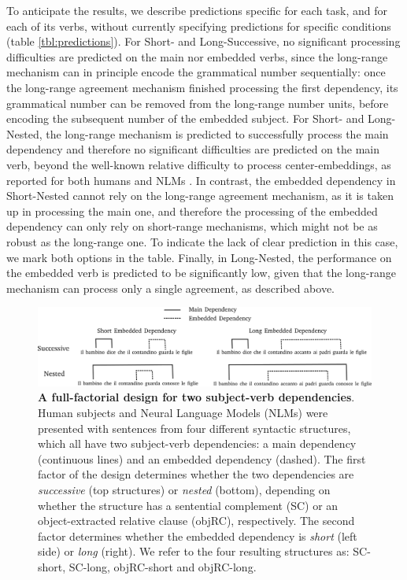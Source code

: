 To anticipate the results, we describe predictions specific for each task, and for each of its verbs, without currently specifying predictions for specific conditions (table \ref{tbl:predictions}). For Short- and Long-Successive, no significant processing difficulties are predicted on the main nor embedded verbs, since the long-range mechanism can in principle encode the grammatical number sequentially: once the long-range agreement mechanism finished processing the first dependency, its grammatical number can be removed from the long-range number units, before encoding the subsequent number of the embedded subject. For Short- and Long-Nested, the long-range mechanism is predicted to successfully process the main dependency and therefore no significant difficulties are predicted on the main verb, beyond the well-known relative difficulty to process center-embeddings, as reported for both humans \citep{traxler2002processing} and NLMs \citep{marvin2018targeted}. In contrast, the embedded dependency in Short-Nested cannot rely on the long-range agreement mechanism, as it is taken up in processing the main one, and therefore the processing of the embedded dependency can only rely on short-range mechanisms, which might not be as robust as the long-range one. To indicate the lack of clear prediction in this case, we mark both options in the table. Finally, in Long-Nested, the performance on the embedded verb is predicted to be significantly low, given that the long-range mechanism can process only a single agreement, as described above. 



\begin{figure}
    \centering
    \includegraphics[width=\textwidth]{figures/design.png}
    \caption{\textbf{A full-factorial design for two subject-verb dependencies}. Human subjects and Neural Language Models (NLMs) were presented with sentences from four different syntactic structures, which all have two subject-verb dependencies: a main dependency (continuous lines) and an embedded dependency (dashed). The first factor of the design determines whether the two dependencies are \textit{successive} (top structures) or \textit{nested} (bottom), depending on whether the structure has a sentential complement (SC) or an object-extracted relative clause (objRC), respectively. The second factor determines whether the embedded dependency is \textit{short} (left side) or \textit{long} (right). We refer to the four resulting structures as: SC-short, SC-long, objRC-short and objRC-long.}
    \label{fig:design}
\end{figure}
